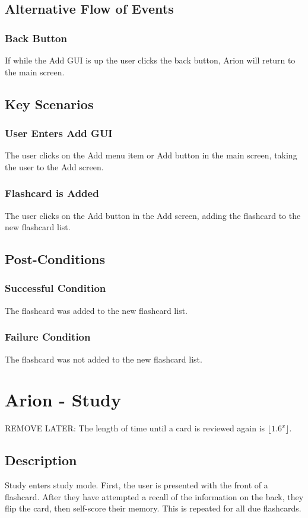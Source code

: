 \documentclass{scrreprt}
\begin{document}
\section{Alternative Flow of Events}

    \subsection{Back Button}
    If while the Add GUI is up the user clicks the back button,
    Arion will return to the main screen.


\section{Key Scenarios}
    \subsection{User Enters Add GUI}
    The user clicks on the Add menu item or Add button in the main screen,
    taking the user to the Add screen.

    \subsection{Flashcard is Added}
    The user clicks on the Add button in the Add screen, adding the flashcard to
    the new flashcard list.

\section{Post-Conditions}
    \subsection{Successful Condition}
    The flashcard was added to the new flashcard list.
    
    \subsection{Failure Condition}
    The flashcard was not added to the new flashcard list.

\chapter{Arion - Study}
REMOVE LATER: The length of time until a card is reviewed again is $\lfloor 1.6^x \rfloor$.

\section{Description}
Study enters study mode. First, the user is presented with the front of a flashcard.
After they have attempted a recall of the information on the back, they flip the card,
then self-score their memory. This is repeated for all due flashcards.
\end{document}
